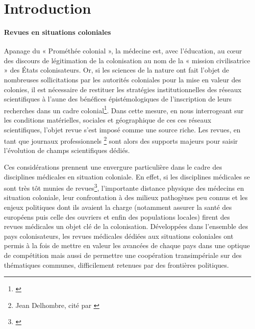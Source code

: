 \mainmatter
\chapter*{Introduction}

\subsubsection{Revues en situations coloniales}
Apanage du « Prométhée colonial », la médecine est, avec l’éducation, au cœur des discours de légitimation de la colonisation au nom de la « mission civilisatrice » des États colonisateurs. Or, si les sciences de la nature ont fait l'objet de nombreuses sollicitations par les autorités coloniales pour la \og mise en valeur des colonies\fg, il est nécessaire de restituer les stratégies institutionnelles des réseaux scientifiques à l'aune des bénéfices épistémologiques de l'inscription de leurs recherches dans un cadre colonial\footnote{\cite{bonneuil_savants_1991}}.
Dans cette mesure, en nous interrogeant sur les conditions matérielles, sociales et géographique de ces ces réseaux scientifiques, l'objet revue s'est imposé comme une source riche. Les revues, en tant que \og journaux professionnels \fg \footnote{Jean Delhombre, cité par \cite{tesniere_au_2021}} sont alors des supports majeurs pour saisir l'évolution de champs scientifiques dédiés. 

Ces considérations prennent une envergure particulière dans le cadre des disciplines médicales en situation coloniale. En effet, si les disciplines médicales se sont très tôt munies de revues\footnote{\cite{tesniere_les_2014}}, l’importante distance physique des médecins en situation coloniale, leur confrontation à des milieux pathogènes peu connus et les enjeux politiques dont ils avaient la charge (notamment assurer la santé des européens puis celle des ouvriers et enfin des populations locales) firent des revues médicales un objet clé de la colonisation.  Développées dans l’ensemble des pays colonisateurs, les revues médicales dédiées aux situations coloniales ont permis à la fois de mettre en valeur les avancées de chaque pays dans une optique de compétition mais aussi de permettre une coopération transimpériale sur des thématiques communes, difficilement retenues par des frontières politiques.














